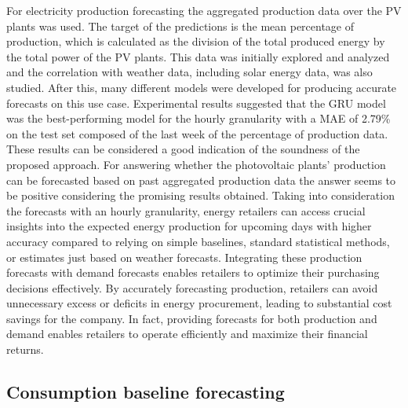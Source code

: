 For electricity production forecasting the aggregated production data over the PV plants was used.
The target of the predictions is the mean percentage of production, which is calculated as the division of the total produced energy by the total power of the PV plants.
This data was initially explored and analyzed and the correlation with weather data, including solar energy data, was also studied.
After this, many different models were developed for producing accurate forecasts on this use case.
Experimental results suggested that the GRU model was the best-performing model for the hourly granularity with a MAE of 2.79\% on the test set composed of the last week of the percentage of production data.
These results can be considered a good indication of the soundness of the proposed approach.
For answering whether the photovoltaic plants' production can be forecasted based on past aggregated production data the answer seems to be positive considering the promising results obtained.
Taking into consideration the forecasts with an hourly granularity, energy retailers can access crucial insights into the expected energy production for upcoming days with higher accuracy compared to relying on simple baselines, standard statistical methods, or estimates just based on weather forecasts.
Integrating these production forecasts with demand forecasts enables retailers to optimize their purchasing decisions effectively.
By accurately forecasting production, retailers can avoid unnecessary excess or deficits in energy procurement, leading to substantial cost savings for the company.
In fact, providing forecasts for both production and demand enables retailers to operate efficiently and maximize their financial returns.


\vspace{0.1 cm}
\subsection{Consumption baseline forecasting}
\label{sec:conclusionsbaseline}
\vspace{0.1 cm}


